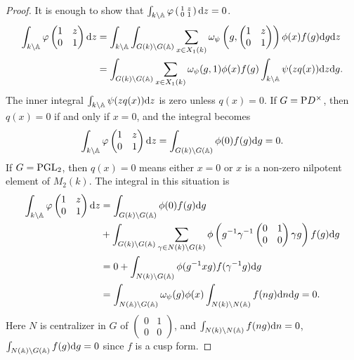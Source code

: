 \begin{proof}
It is enough to show that $\int_{k\backslash \mathbb{A}} \varphi\left(\begin{smallmatrix}
    1 & z \\ 0 & 1
\end{smallmatrix}\right)\mathrm{d} z = 0$.
\begin{align*}
\int_{k \backslash \mathbb{A}} \varphi \begin{pmatrix}
    1 & z \\ 0 & 1
\end{pmatrix} \mathrm{d} z &= \int_{k \backslash \mathbb{A}} \int_{G(k) \backslash G(\mathbb{A})}  \sum_{x \in X_1(k)} \omega_\psi\left(g, \begin{pmatrix}
    1 & z \\ 0 & 1
\end{pmatrix}\right)\phi(x) f(g) \mathrm{d} g \mathrm{d} z \\
&= \int_{G(k) \backslash G(\mathbb{A})} \sum_{x \in X_1(k)} \omega_\psi(g, 1) \phi(x) f(g) \int_{k \backslash \mathbb{A}} \psi(z q(x)) \mathrm{d} z \mathrm{d} g.
\end{align*}
The inner integral $\int_{k \backslash \mathbb{A}} \psi(z q(x)) \mathrm{d} z$ is zero unless $q(x) = 0$.
If $G = \mathrm{P} D^\times$, then $q(x) = 0$ if and only if $x = 0$, and the integral becomes
\[
\int_{k \backslash \mathbb{A}} \varphi \begin{pmatrix}
    1 & z \\ 0 & 1
\end{pmatrix} \mathrm{d} z = \int_{G(k) \backslash G(\mathbb{A})} \phi(0) f(g) \mathrm{d} g = 0.
\]
If $G = \mathrm{PGL}_2$, then $q(x)=0$ means either $x = 0$ or $x$ is a non-zero nilpotent element of $M_2(k)$. The integral in this situation is
\begin{align*}
    \int_{k \backslash \mathbb{A}} \varphi \begin{pmatrix}
        1 & z \\ 0 & 1
    \end{pmatrix} \mathrm{d} z &= \int_{G(k) \backslash G(\mathbb{A})} \phi(0) f(g) \mathrm{d} g \\
    &+ \int_{G(k) \backslash G(\mathbb{A})} \sum_{\gamma \in N(k) \backslash G(k)} \phi \left(g^{-1} \gamma^{-1} \begin{pmatrix}
        0 & 1 \\ 0 & 0
    \end{pmatrix} \gamma g\right) f(g) \mathrm{d} g \\
    &= 0 + \int_{N(k) \backslash G(\mathbb{A})} \phi(g^{-1} xg) f(\gamma^{-1} g) \mathrm{d} g \\
    &= \int_{N(\mathbb{A}) \backslash G(\mathbb{A})} \omega_\psi(g) \phi(x) \int_{N(k) \backslash N(\mathbb{A})} f(ng) \mathrm{d} n \mathrm{d} g = 0.
\end{align*}
Here $N$ is centralizer in $G$ of $\left(\begin{smallmatrix}
    0 & 1 \\ 0& 0
\end{smallmatrix}\right)$, and $\int_{N(k) \backslash N(\mathbb{A})} f(ng) \mathrm{d} n = 0$, $\int_{N(\mathbb{A}) \backslash G(\mathbb{A})} f(g) \mathrm{d} g = 0$  since $f$ is a cusp form.
\end{proof}

